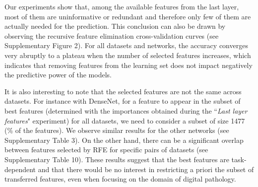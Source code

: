 Our experiments show that, among the available features from the last layer, most of them are uninformative or redundant and therefore only few of them are actually needed for the prediction. This conclusion can also be drawn by observing the recursive feature elimination cross-validation curves (see Supplementary Figure 2). For all datasets and networks, the accuracy converges very abruptly to a plateau when the number of selected features increases, which indicates that removing features from the learning set does not impact negatively the predictive power of the models.

It is also interesting to note that the selected features are not the same across datasets. For instance with DenseNet, for a feature to appear in the subset of best features (determined with the importances obtained during the ``\textit{Last layer features}" experiment) for all datasets, we need to consider a subset of size 1477 (\% of the features). We observe similar results for the other networks (see Supplementary Table 3). On the other hand, there can be a significant overlap between features selected by RFE for specific pairs of datasets (see Supplementary Table 10). These results suggest that the best features are task-dependent and that there would be no interest in restricting a priori the subset of transferred features, even when focusing on the domain of digital pathology.
 
 
 
